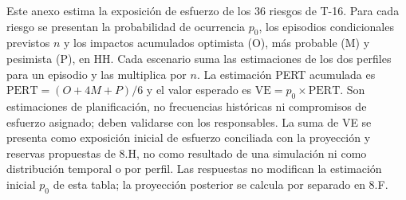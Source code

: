 \documentclass[carta,firma,sinnotas]{lafrox}
\begin{document}
Este anexo estima la exposición de esfuerzo de los 36 riesgos de T-16. Para cada riesgo se presentan la probabilidad de ocurrencia $p_0$, los episodios condicionales previstos $n$ y los impactos acumulados optimista (O), más probable (M) y pesimista (P), en HH. Cada escenario suma las estimaciones de los dos perfiles para un episodio y las multiplica por $n$. La estimación PERT acumulada es $\mathrm{PERT}=(O+4M+P)/6$ y el valor esperado es $\mathrm{VE}=p_0\times\mathrm{PERT}$. Son estimaciones de planificación, no frecuencias históricas ni compromisos de esfuerzo asignado; deben validarse con los responsables. La suma de VE se presenta como exposición inicial de esfuerzo conciliada con la proyección y reservas propuestas de 8.H, no como resultado de una simulación ni como distribución temporal o por perfil. Las respuestas no modifican la estimación inicial $p_0$ de esta tabla; la proyección posterior se calcula por separado en 8.F.
\end{document}
